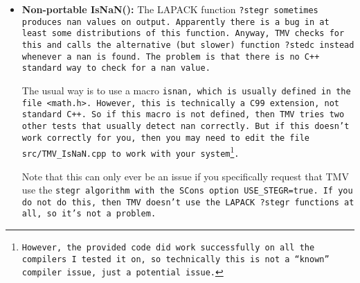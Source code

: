 \begin{itemize}
\item {\bf Non-portable IsNaN():}
The LAPACK function \tt{?stegr} sometimes produces \tt{nan} values on output.
Apparently there is a bug in at least some distributions of this function.
Anyway, TMV checks for this and calls the alternative (but slower) function
\tt{?stedc} instead whenever a \tt{nan} is found.  
The problem is that there is no C++ standard way to check
for a \tt{nan} value.  

The usual way is to use a macro \tt{isnan}, which is usually
defined in the file \tt{<math.h>}.  However, this is technically a C99 extension,
not standard C++.  So if this macro is not defined, then TMV tries two other
tests that usually detect \tt{nan} correctly.  But if this doesn't work correctly
for you, then you may need to edit the file \texttt{src/TMV\_IsNaN.cpp} to work
with your system\footnote{
However, the provided code did work successfully on all the compilers I 
tested it on, so technically this is not a ``known'' compiler issue, just a 
potential issue.}.

Note that this can only ever be an issue if you specifically request that TMV use the \tt{stegr} algorithm with the SCons option \tt{USE_STEGR=true}.  If you do not do this, then TMV doesn't use the LAPACK \tt{?stegr} functions at all, so it's not a problem.

\end{itemize}

